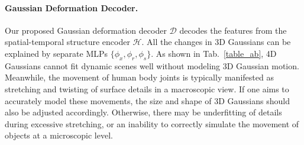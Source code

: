 \documentclass[10pt,twocolumn,letterpaper]{article}
\begin{document}
\vspace{-5pt}
\paragraph{Gaussian Deformation Decoder.}
Our proposed Gaussian deformation decoder $\mathcal{D}$ decodes the features from the spatial-temporal structure encoder $\mathcal{H}$. All the changes in 3D Gaussians can be explained by separate MLPs $\{\phi_x,\phi_r,\phi_s\}$. As shown in Tab.~\ref{table_ab}, 4D Gaussians cannot fit dynamic scenes well without modeling 3D Gaussian motion. Meanwhile, the movement of human body joints is typically manifested as stretching and twisting of surface details in a macroscopic view. If one aims to accurately model these movements, the size and shape of 3D Gaussians should also be adjusted accordingly. Otherwise, there may be underfitting of details during excessive stretching, or an inability to correctly simulate the movement of objects at a microscopic level. 
\vspace{-5pt}
\end{document}
